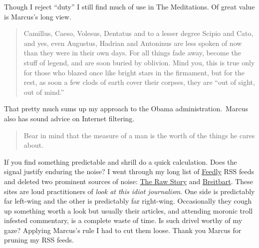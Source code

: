 Though I reject ``duty'' I still find much of use in The Meditations. Of
great value is Marcus's long view.

\begin{quote}
Camillus, Caeso, Volesus, Dentatus and to a lesser degree Scipio and
Cato, and yes, even Augustus, Hadrian and Antoninus are less spoken of
now than they were in their own days. For all things fade away, become
the stuff of legend, and are soon buried by oblivion. Mind you, this is
true only for those who blazed once like bright stars in the firmament,
but for the rest, as soon a few clods of earth cover their corpses, they
are ``out of sight, out of mind.''
\end{quote}

That pretty much sums up my approach to the Obama administration.~Marcus
also has sound advice on Internet filtering.

\begin{quote}
Bear in mind that the measure of a man is the worth of the things he
cares about.
\end{quote}

If you find something predictable and shrill do a quick calculation.
Does the signal justify enduring the noise? I went through my long list
of \href{http://feedly.com/}{Feedly} RSS feeds and deleted two prominent
sources of noise: \href{http://www.rawstory.com/}{The Raw Story} and
\href{http://www.breitbart.com/}{Breitbart}. These sites are loud
practitioners of \emph{look at this idiot journalism}. One side is
predictably far left-wing and the other is predictably far right-wing.
Occasionally they cough up something worth a look but usually their
articles, and attending moronic troll infested commentary, is a complete
waste of time. Is such drivel worthy of my gaze? Applying Marcus's rule
I had to cut them loose. Thank you Marcus for pruning my RSS feeds.






%